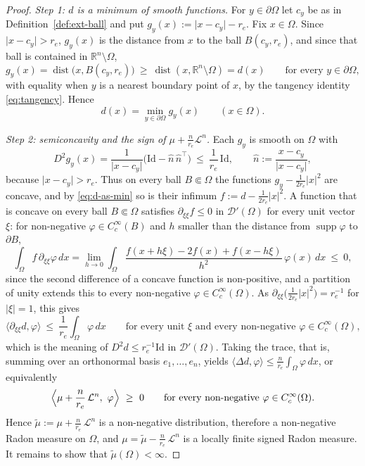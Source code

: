 \documentclass[11pt]{article}
\newcommand{\R}{\mathbb R}
\newcommand{\abs}[1]{\lvert #1\rvert}
\newcommand{\dist}{\operatorname{dist}}
\theoremstyle{definition}
\theoremstyle{remark}
\begin{document}
\begin{proof}
\emph{Step 1: $d$ is a minimum of smooth functions.}
For $y\in\partial\Omega$ let $c_y$ be as in Definition~\ref{def:ext-ball} and
put $g_y(x):=\abs{x-c_y}-r_e$. Fix $x\in\Omega$. Since $\abs{x-c_y}>r_e$,
$g_y(x)$ is the distance from $x$ to the ball $B(c_y,r_e)$, and since that
ball is contained in $\R^n\setminus\Omega$,
\[
g_y(x)=\dist\bigl(x,B(c_y,r_e)\bigr)\ \ge\ \dist(x,\R^n\setminus\Omega)=d(x)
\qquad\text{for every }y\in\partial\Omega,
\]
with equality when $y$ is a nearest boundary point of $x$, by the tangency
identity \eqref{eq:tangency}. Hence
\begin{equation}\label{eq:d-as-min}
d(x)=\min_{y\in\partial\Omega}g_y(x)\qquad(x\in\Omega).
\end{equation}

\emph{Step 2: semiconcavity and the sign of $\mu+\frac n{r_e}\mathcal L^n$.}
Each $g_y$ is smooth on $\Omega$ with
\[
D^2g_y(x)=\frac{1}{\abs{x-c_y}}\bigl(\mathrm{Id}-\hat n\,\hat n^{\top}\bigr)
\ \le\ \frac1{r_e}\,\mathrm{Id},
\qquad \hat n:=\frac{x-c_y}{\abs{x-c_y}},
\]
because $\abs{x-c_y}>r_e$. Thus on every ball $B\Subset\Omega$ the functions
$g_y-\tfrac1{2r_e}\abs{x}^2$ are concave, and by \eqref{eq:d-as-min} so is
their infimum $f:=d-\tfrac1{2r_e}\abs{x}^2$. A function that is concave on
every ball $B\Subset\Omega$ satisfies $\partial_{\xi\xi}f\le0$ in
$\mathcal D'(\Omega)$ for every unit vector $\xi$: for non-negative
$\varphi\in C_c^\infty(B)$ and $h$ smaller than the distance from
$\operatorname{supp}\varphi$ to $\partial B$,
\[
\int_\Omega f\,\partial_{\xi\xi}\varphi\,dx
=\lim_{h\to0}\int_\Omega
\frac{f(x+h\xi)-2f(x)+f(x-h\xi)}{h^{2}}\,\varphi(x)\,dx\ \le\ 0,
\]
since the second difference of a concave function is non-positive, and a
partition of unity extends this to every non-negative
$\varphi\in C_c^\infty(\Omega)$. As $\partial_{\xi\xi}\bigl(\tfrac1{2r_e}\abs{x}^2\bigr)=r_e^{-1}$
for $\abs\xi=1$, this gives
\[
\langle\partial_{\xi\xi}d,\varphi\rangle\ \le\ \frac1{r_e}\int_\Omega\varphi\,dx
\qquad\text{for every unit }\xi\text{ and every non-negative }
\varphi\in C_c^\infty(\Omega),
\]
which is the meaning of $D^2d\le r_e^{-1}\mathrm{Id}$ in $\mathcal D'(\Omega)$.
Taking the trace, that is, summing over an orthonormal basis $e_1,\dots,e_n$,
yields $\langle\Delta d,\varphi\rangle\le\frac n{r_e}\int_\Omega\varphi\,dx$,
or equivalently
\[
\Bigl\langle\mu+\frac n{r_e}\,\mathcal L^n,\ \varphi\Bigr\rangle\ \ge\ 0
\qquad\text{for every non-negative }\varphi\in C_c^\infty(\Omega).
\]
Hence $\widetilde\mu:=\mu+\frac n{r_e}\,\mathcal L^n$ is a non-negative
distribution, therefore a non-negative Radon measure on $\Omega$, and
$\mu=\widetilde\mu-\frac n{r_e}\,\mathcal L^n$ is a locally finite signed Radon
measure. It remains to show that $\widetilde\mu(\Omega)<\infty$.


\end{proof}
\end{document}
